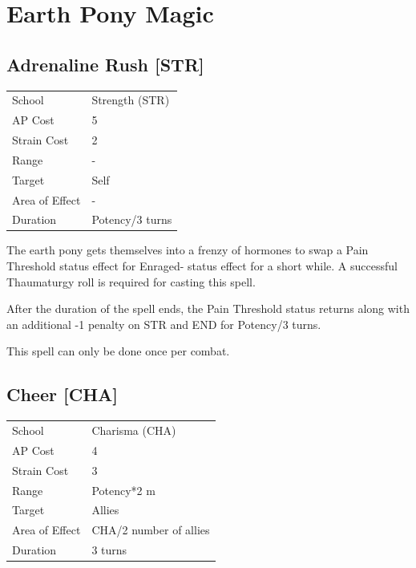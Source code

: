 \documentclass[11pt,a4paper,twocolumn]{book}
\begin{document}
\chapter{Earth Pony Magic}


\section*{Adrenaline Rush [STR]}
{
	\begin{tabu} to 75mm{| X[l,4] | X[l,7] |}
		\hline
		School 			& Strength (STR) 	\\
        AP Cost	      	& 5 				\\
        Strain Cost     & 2 				\\
        Range     		& - 				\\
        Target      	& Self 				\\
        Area of Effect  & - 	 			\\
        Duration     	& Potency/3 turns 	\\ \hline
	\end{tabu}
		
}

\medskip

The earth pony gets themselves into a frenzy of hormones to swap a Pain Threshold status effect for Enraged- status effect for a short while. A successful Thaumaturgy roll is required for casting this spell.

After the duration of the spell ends, the Pain Threshold status returns along with an additional -1 penalty on STR and END for Potency/3 turns.

This spell can only be done once per combat.


\section*{Cheer [CHA]}
{
	\begin{tabu} to 75mm{| X[l,4] | X[l,7] |}
		\hline
		School 			& Charisma (CHA) 	\\
        AP Cost	      	& 4 				\\
        Strain Cost     & 3 				\\
        Range     		& Potency*2 m 		\\
        Target      	& Allies 			\\
        Area of Effect  & CHA/2 number of allies	 			\\
        Duration     	& 3 turns 			\\ \hline
	\end{tabu}
		
}
\end{document}
